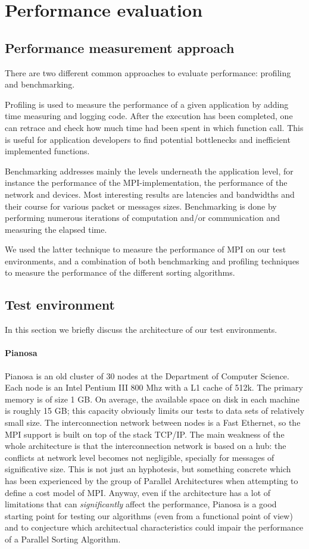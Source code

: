 \section{Performance evaluation}

\subsection{Performance measurement approach}
\label{test-env}
There are two different common approaches to evaluate performance: profiling and benchmarking.

Profiling is used to measure the performance of a given application by adding time measuring and logging code. After the execution has been completed, one can retrace and check how much time had been spent in which function call. This is useful for application developers to find potential bottlenecks and inefficient implemented functions.

Benchmarking addresses mainly the levels underneath the application level, for instance the performance
of the MPI-implementation, the performance of the network and devices. Most interesting results are latencies and bandwidths and their course for various packet or messages sizes. Benchmarking is done by performing numerous iterations of computation and/or communication and measuring the elapsed time.

We used the latter technique to measure the performance of MPI on our test environments, and a combination of both benchmarking and profiling techniques to measure the performance of the different sorting algorithms.

\subsection{Test environment}
In this section we briefly discuss the architecture of our test environments. 

\paragraph{Pianosa}
Pianosa is an old cluster of 30 nodes at the Department of Computer Science. Each node is an Intel Pentium III 800 Mhz with a L1 cache of 512k. The primary memory is of size 1 GB. On average, the available space on disk in each machine is roughly 15 GB; this capacity obviously limits our tests to data sets of relatively small size. The interconnection network between nodes is a Fast Ethernet, so the MPI support is built on top of the stack TCP/IP. The main weakness of the whole architecture is that the interconnection network is based on a hub: the conflicts at network level becomes not negligible, specially for messages of significative size. This is not just an hyphotesis, but something concrete which has been experienced by the group of Parallel Architectures when attempting to define a cost model of MPI. Anyway, even if the architecture has a lot of limitations that can \textit{significantly} affect the performance, Pianosa is a good starting point for testing our algorithms (even from a functional point of view) and to conjecture which architectual characteristics could impair the performance of a Parallel Sorting Algorithm.

